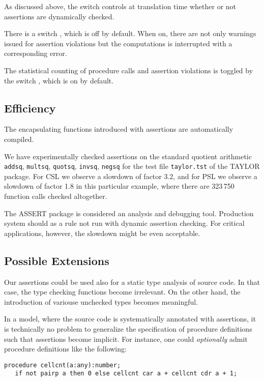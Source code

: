 As discussed above, the switch  controls at
translation time whether or not assertions are dynamically checked.

There is a switch , which is off by default. When
on, there are not only warnings issued for assertion violations but the
computations is interrupted with a corresponding error.

The statistical counting of procedure calls and assertion violations is
toggled by the switch , which is on by default.

\subsection{Efficiency}
The encapsulating functions introduced with assertions are automatically
compiled.






We have experimentally checked assertions on the standard quotient
arithmetic \texttt{addsq}, \texttt{multsq}, \texttt{quotsq},
\texttt{invsq}, \texttt{negsq} for the test file \texttt{taylor.tst} of
the TAYLOR package. For CSL we observe a slowdown of factor 3.2, and for
PSL we observe a slowdown of factor 1.8 in this particular example,
where there are 323\,750 function calls checked altogether.

The ASSERT package is considered an analysis and debugging tool.
Production system should as a rule not run with dynamic assertion
checking. For critical applications, however, the slowdown might be
even acceptable.

\subsection{Possible Extensions}
Our assertions could be used also for a static type analysis of source
code. In that case, the type checking functions become irrelevant. On
the other hand, the introduction of variouse unchecked types becomes
meaningful.

In a model, where the source code is systematically annotated with
assertions, it is technically no problem to generalize the specification
of procedure definitions such that assertions become implicit. For
instance, one could \emph{optionally} admit procedure definitions like
the following:
\begin{verbatim}
procedure cellcnt(a:any):number;
   if not pairp a then 0 else cellcnt car a + cellcnt cdr a + 1;
\end{verbatim}

